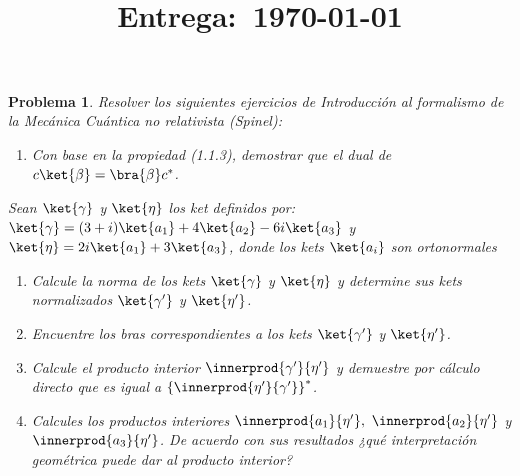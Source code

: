\documentclass[12pt]{article}
\title{
    \textbf{\homeworknumber}\\
    \normalsize\vspace{0.1in}\small{\textbf{Entrega}:~\today}
    \vspace{-1.5in}
}
\author{}
\date{}
\theoremstyle{break}
\newtheorem{exercise}{Problema}
\theoremstyle{nonumberbreak}
\begin{document}
    \maketitle
    \thispagestyle{fancy}
    
    \begin{exercise}
        Resolver los siguientes ejercicios de \emph{Introducción al formalismo de la Mecánica Cuántica no relativista} (Spinel):

        \begin{enumerate}[label = (\alph*)]
            \item Con base en la propiedad (1.1.3), demostrar que el dual de \(c\ket{\beta} = \bra{\beta} c^{*}\).
        \end{enumerate}

        Sean \(\ket{\gamma}\) y \(\ket{\eta}\) los ket definidos por: \(\ket{\gamma} = (3 + i)\ket{a_{1}} + 4\ket{a_{2}} - 6i\ket{a_{3}}\) y \(\ket{\eta} = 2i\ket{a_{1}}+ 3\ket{a_{3}}\), donde los kets \(\ket{a_{i}}\) son ortonormales

        \begin{enumerate}[resume*]
            \item Calcule la norma de los kets \(\ket{\gamma}\) y \(\ket{\eta}\) y determine sus kets normalizados \(\ket{\gamma^{\prime}}\) y \(\ket{\eta^{\prime}}\).
            \item Encuentre los bras correspondientes a los kets \(\ket{\gamma^{\prime}}\) y \(\ket{\eta^{\prime}}\).
            \item Calcule el producto interior \(\innerprod{\gamma^{\prime}}{\eta^{\prime}}\) y demuestre por cálculo directo que es igual a \(\left\lbrace\innerprod{\eta^{\prime}}{\gamma^{\prime}}\right\rbrace^{*}\).
            \item Calcules los productos interiores \(\innerprod{a_{1}}{\eta^{\prime}},\ \innerprod{a_{2}}{\eta^{\prime}}\) y \(\innerprod{a_{3}}{\eta^{\prime}}\). De acuerdo con sus resultados ¿qué interpretación geométrica puede dar al producto interior?
        \end{enumerate}
    \end{exercise}
\end{document}
